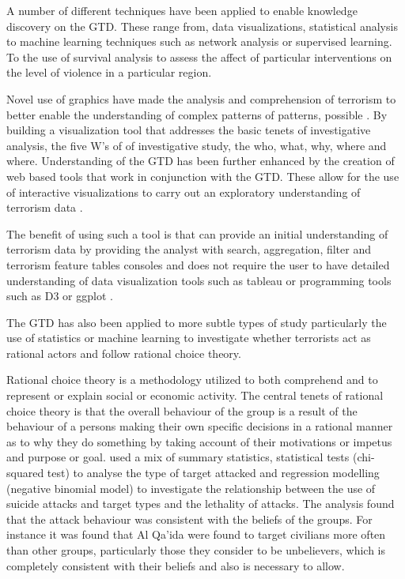 A number of different techniques have been applied to enable knowledge discovery on the GTD. These range from, data visualizations, statistical analysis to machine learning techniques such as network analysis or supervised learning. To the use of survival analysis to assess the affect of particular interventions on the level of violence in a particular region.

Novel use of graphics have made the analysis and comprehension of terrorism to better enable the understanding of complex patterns of patterns, possible \citep{wang2008investigative}. By building a visualization tool that addresses the basic tenets of investigative analysis, the five W's of of investigative study, the who, what, why, where and where. Understanding of the GTD has been further enhanced by the creation of web based tools that work in conjunction with the GTD. These allow for the use of interactive visualizations  to carry out an exploratory understanding of terrorism data \citep{lee2008exploring}. 

The benefit of using such a tool is that can provide an initial understanding of terrorism data by providing the analyst with search, aggregation, filter  and terrorism feature tables consoles and does not require the user to have detailed understanding of data visualization tools such as tableau \citep{chabot2003tableau} or programming tools such as D3 \citep{bostock2012d3} or ggplot \citep{wickham2016programming}.

The GTD has also been applied to more subtle types of study particularly the use of statistics or machine learning to investigate whether terrorists act as rational actors and follow rational choice theory. 

Rational choice theory is a methodology utilized to both comprehend and to represent or explain social or economic activity. The central tenets of rational choice theory is  that the overall behaviour of the group is a result of the behaviour of   a persons making their own specific decisions in a rational manner as to why they do something by taking account of their motivations or impetus and purpose or goal. \citep{hepworth2013analysis} used a mix of summary statistics, statistical tests (chi-squared test) to analyse the type of target attacked and regression modelling (negative binomial model) to investigate the relationship between the use of suicide attacks and target types and the lethality of attacks. The analysis found that the attack behaviour was consistent with the beliefs of the groups. For instance it was found that Al Qa'ida were found to target civilians more often than other groups, particularly those they consider to be unbelievers, which is completely consistent with their beliefs and also is necessary to allow.

